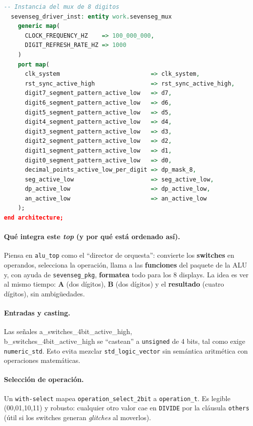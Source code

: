 \documentclass[a4paper,12pt]{article}
\begin{document}
\begin{lstlisting}[language=VHDL,caption={Módulo TOP: integra ALU, formato de salida y driver de 7 segmentos.},label={lst:alu-top}]
  -- Instancia del mux de 8 digitos
  sevenseg_driver_inst: entity work.sevenseg_mux
    generic map(
      CLOCK_FREQUENCY_HZ    => 100_000_000,
      DIGIT_REFRESH_RATE_HZ => 1000
    )
    port map(
      clk_system                          => clk_system,
      rst_sync_active_high                => rst_sync_active_high,
      digit7_segment_pattern_active_low   => d7,
      digit6_segment_pattern_active_low   => d6,
      digit5_segment_pattern_active_low   => d5,
      digit4_segment_pattern_active_low   => d4,
      digit3_segment_pattern_active_low   => d3,
      digit2_segment_pattern_active_low   => d2,
      digit1_segment_pattern_active_low   => d1,
      digit0_segment_pattern_active_low   => d0,
      decimal_points_active_low_per_digit => dp_mask_8,
      seg_active_low                      => seg_active_low,
      dp_active_low                       => dp_active_low,
      an_active_low                       => an_active_low
    );
end architecture;
\end{lstlisting}

\paragraph{Qué integra este \textit{top} (y por qué está ordenado así).}
Piensa en \texttt{alu\_top} como el “director de orquesta”: convierte los \textbf{switches} en operandos, selecciona la operación, llama a las \textbf{funciones} del paquete de la ALU y, con ayuda de \texttt{sevenseg\_pkg}, \textbf{formatea} todo para los 8 displays. La idea es ver al mismo tiempo: \textbf{A} (dos dígitos), \textbf{B} (dos dígitos) y el \textbf{resultado} (cuatro dígitos), sin ambigüedades.

\paragraph{Entradas y casting.}
Las señales a\_switches\_4bit\_active\_high,  \\ b\_switches\_4bit\_active\_high se “castean” a \texttt{unsigned} de 4 bits, tal como exige \texttt{numeric\_std}. Esto evita mezclar \texttt{std\_logic\_vector} sin semántica aritmética con operaciones matemáticas.

\paragraph{Selección de operación.}
Un \texttt{with-select} mapea \texttt{operation\_select\_2bit} a \texttt{operation\_t}. Es legible (00,01,10,11) y robusto: cualquier otro valor cae en \texttt{DIVIDE} por la cláusula \texttt{others} (útil si los switches generan \emph{glitches} al moverlos).
\end{document}
